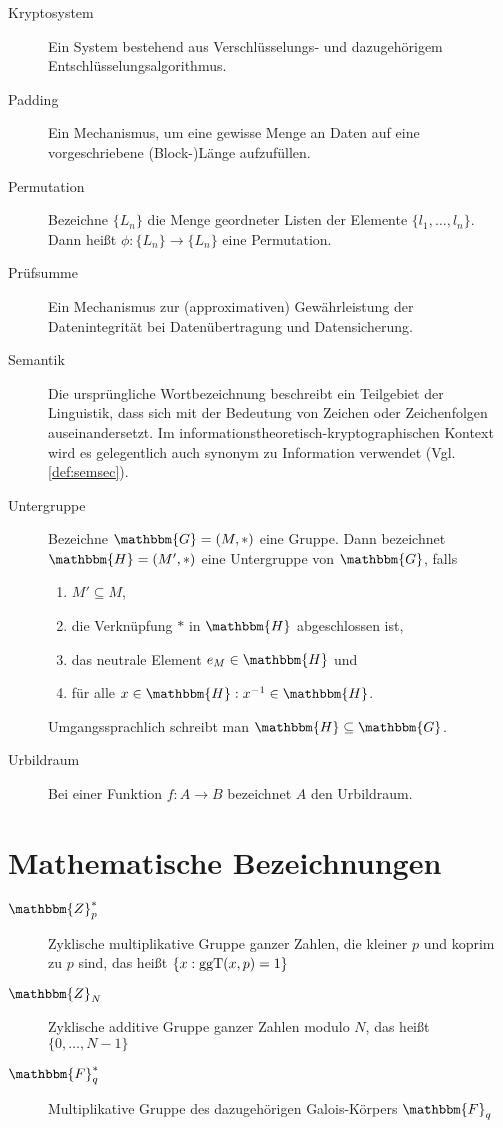 \begin{description}
	\item[Kryptosystem] Ein System bestehend aus Verschlüsselungs- und dazugehörigem Entschlüsselungsalgorithmus.
	\item[Padding] Ein Mechanismus, um eine gewisse Menge an Daten auf eine vorgeschriebene (Block-)Länge aufzufüllen. %
	\item[Permutation] Bezeichne $\{L_n\}$ die Menge geordneter Listen der Elemente $\{l_1, \dots, l_n\}$. Dann heißt $\phi\colon \{L_n\} \rightarrow \{L_n\}$ eine Permutation.
	\item[Prüfsumme] Ein Mechanismus zur (approximativen) Gewährleistung der Datenintegrität bei Datenübertragung und Datensicherung.
	\item[Semantik] Die ursprüngliche Wortbezeichnung beschreibt ein Teilgebiet der Linguistik, dass sich mit der Bedeutung von Zeichen oder Zeichenfolgen
	auseinandersetzt. Im informationstheoretisch-kryptographischen Kontext wird es gelegentlich auch synonym zu Information verwendet (Vgl. 
	\ref{def:semsec}).
	\item[Untergruppe] Bezeichne $\mathbbm{G} = (M, \ast)$ eine Gruppe. Dann bezeichnet $\mathbbm{H} = (M', \ast)$ eine Untergruppe von $\mathbbm{G}$,
	falls
	\begin{enumerate}
		\item $M' \subseteq M$,
		\item die Verknüpfung $\ast$ in $\mathbbm{H}$ abgeschlossen ist,
		\item das neutrale Element $e_M \in \mathbbm{H}$ und
		\item für alle $x \in \mathbbm{H} : x^{-1} \in \mathbbm{H}$.
	\end{enumerate}
	Umgangssprachlich schreibt man $\mathbbm{H} \subseteq \mathbbm{G}$.
	\item[Urbildraum] Bei einer Funktion $f\colon A \rightarrow B$ bezeichnet $A$ den Urbildraum.
\end{description}

\section{Mathematische Bezeichnungen}
\begin{description}
	\item[$\mathbbm{Z}^{\ast}_p$] Zyklische multiplikative Gruppe ganzer Zahlen, die kleiner $p$ und koprim zu $p$ sind, das heißt $\{x : \operatorname{ggT}(x, p) = 1\}$
	\item[$\mathbbm{Z}_N$] Zyklische additive Gruppe ganzer Zahlen modulo $N$, das heißt $\{0, \dots, N-1\}$
	\item[$\mathbbm{F}^{\ast}_q$] Multiplikative Gruppe des dazugehörigen Galois-Körpers $\mathbbm{F}_q$
\end{description}

